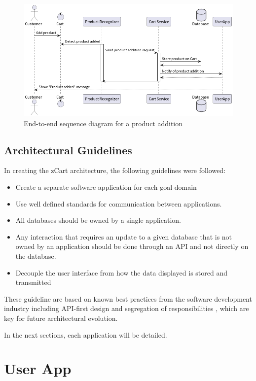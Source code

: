 \documentclass[openright]{normas-utf-tex} %
\begin{document}
\begin{figure}[H]
	\centering
	\includegraphics[width=1\textwidth]{./images/E2E.png}
	\caption[End-to-end sequence diagram for a product addition]{End-to-end sequence diagram for a product addition}
	\label{fig:e2eseq}
\end{figure}

\subsection{Architectural Guidelines}
In creating the zCart architecture, the following guidelines were followed:

\begin{itemize}
    \item Create a separate software application for each goal domain
    \item Use well defined standards for communication between applications.
    \item All databases should be owned by a single application. 
    \item Any interaction that requires an update to a given database that is
        not owned by an application should be done through an API and not
        directly on the database.
    \item Decouple the user interface from how the data displayed is stored and transmitted
\end{itemize}

These guideline are based on known best practices from the software 
development industry including API-first design and segregation of
responsibilities \cite{Sam2021,Kong2022}, which are key for future architectural
evolution.

In the next sections, each application will be  detailed.

\section{User App}
\end{document}

